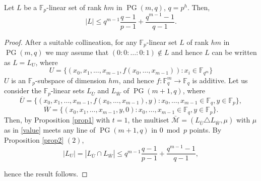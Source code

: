 \documentclass[10pt,a4paper]{amsart}
\DeclareMathOperator{\PG}{{PG}}
\newcommand{\F}{{\mathbb F}}
\newcommand{\cM}{{\mathcal M}}
\begin{document}
\begin{theorem} \label{direction}
	Let $L$ be a $\F_p$-linear set of rank $hm$ in $\PG(m,q)$, $q=p^h$. Then,
	\[\vert L \vert \leq q^{m-1}\frac{q-1}{p-1}+\frac{q^{m-1}-1 }{q-1}.\]
\end{theorem}

\begin{proof}
	After a suitable collineation, for any $\F_p$-linear set $L$ of rank $hm$ in $\PG(m,q)$ we may assume that $(0:0:\ldots :0:1)\notin L$ and hence $L$ can be written as $L=L_U$,  where
	\[U=\{(x_0,x_1,\ldots,x_{m-1}, f(x_0,\ldots,x_{m-1})) : x_i \in \F_{q^m}\}\] 
	$U$ is an $\F_p$-subspace of dimension $hm$, and hence $f\colon \F_{q}^{m} \rightarrow \F_q$ is additive. 
	Let us consider  the $\F_p$-linear sets $L_{\overline{U}}$ and $L_{\overline{W}}$ of $\PG(m+1,q)$, 
	where
	\[
	\overline{U}=\{(x_0,x_1,\ldots,x_{m-1},f(x_0,\ldots,x_{m-1}), y): x_0,\ldots,x_{m-1} \in \F_q, y \in \F_p\},
	\]
	\[
	\overline{W}=\{(x_0,x_1,\ldots,x_{m-1},y,0): x_0,\ldots,x_{m-1} \in \F_q, y \in \F_p\}.
	\]
	Then, by Proposition \ref{prop1} with $t=1$, the multiset $\bar{\cM}=(L_{\overline{U}} \triangle L_{\overline{W}}, \mu)$ with $\mu$ as in \eqref{value}
	meets any line of $\PG(m+1,q)$ in $0 \bmod p$ points.
	By Proposition \ref{prop2} $(2)$,
		\[
		|L_U| =|L_{\overline{U}} \cap L_{\overline{W}}|  \leq q^{m-1}\frac{q-1}{p-1}+\frac{q^{m-1}-1 }{q-1},
		\]
		
		hence the result follows.
	\end{proof}
\end{document}
